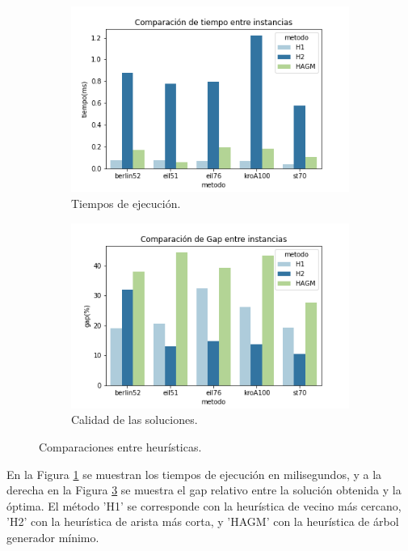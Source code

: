 \documentclass[10pt,a4paper]{article}
\begin{document}
\begin{figure}[h!]
    \centering
    \captionsetup{justification=centering}
    \begin{subfigure}{0.45\linewidth}
        \centering
        \includegraphics[scale=0.5]{Graphs/heur-tiempo.png}
        \caption{Tiempos de ejecución.}
        \label{fig:exp_heur_tiempo}
    \end{subfigure}
    \begin{subfigure}{0.45\linewidth}
        \centering
        \includegraphics[scale=0.5]{Graphs/heur-gap.png}
        \caption{Calidad de las soluciones.}
        \label{fig:exp_heur_gap}
    \end{subfigure}
    \caption{Comparaciones entre heurísticas.}
\end{figure}

En la Figura \ref{fig:exp_heur_tiempo} se muestran los tiempos de ejecución en milisegundos, y a la derecha en la Figura \ref{fig:exp_heur_gap} se muestra el gap relativo entre la solución obtenida y la óptima. El método 'H1' se corresponde con la heurística de vecino más cercano, 'H2' con la heurística de arista más corta, y 'HAGM' con la heurística de árbol generador mínimo.
\end{document}
